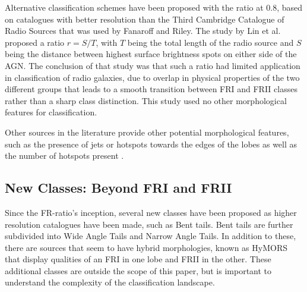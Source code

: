 \documentclass[conference]{IEEEtran}
\begin{document}
Alternative classification schemes have been proposed with the ratio at 0.8, based on catalogues with better resolution than the Third Cambridge Catalogue of Radio Sources that was used by Fanaroff and Riley. 
The study by Lin et al. \cite{lin_2010} proposed a ratio $r = S/T$, with $T$ being the total length of the radio source and $S$ being the distance between highest surface brightness spots on either side of the AGN. The conclusion of that study was that such a ratio had limited application in classification of radio galaxies, due to overlap in physical properties of the two different groups that leads to a smooth transition between FRI and FRII classes rather than a sharp class distinction. This study used no other morphological features for classification.

Other sources in the literature provide other potential morphological features, 
such as the presence of jets \cite{owen_laing_1989} or hotspots towards the edges of 
the lobes \cite{gendre_wall_2009} as well as the number of hotspots present \cite{lukic2018}.

\subsection{New Classes: Beyond FRI and FRII}
Since the FR-ratio's inception, several new classes have been proposed as higher resolution catalogues have been made, such as Bent tails. Bent tails are further subdivided into Wide Angle Tails and Narrow Angle Tails. In addition to these, there are sources that seem to have hybrid morphologies, known as HyMORS \cite{gopalkrishna2000} that display qualities of an FRI in one lobe and FRII in the other. These additional classes are outside the scope of this paper, but is important to understand the complexity of the classification landscape.
\end{document}

